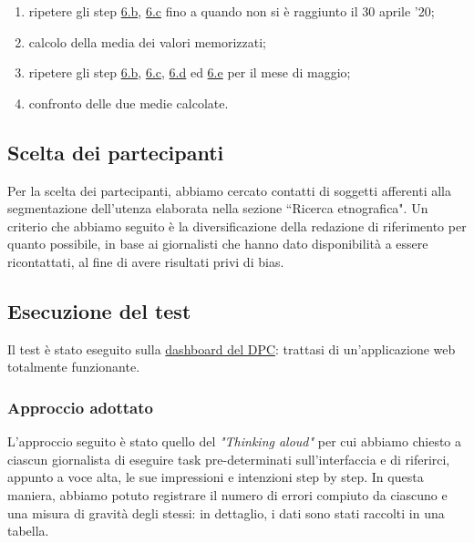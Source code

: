 \begin{enumerate}
\begin{enumerate}[label=\alph*.]
        \item ripetere gli step \hyperref[at:b]{6.b}, \hyperref[at:c]{6.c} fino a quando non si è raggiunto il 30 aprile '20; \label{at:d}
        \item calcolo della media dei valori memorizzati; \label{at:e}
        \item ripetere gli step \hyperref[at:b]{6.b}, \hyperref[at:c]{6.c}, \hyperref[at:d]{6.d} ed \hyperref[at:e]{6.e} per il mese di maggio; 
        \item confronto delle due medie calcolate.
    \end{enumerate}
\end{enumerate}

\subsection{Scelta dei partecipanti}
\label{ss:seclta-partecipanti}
Per la scelta dei partecipanti, abbiamo cercato contatti di soggetti afferenti alla segmentazione dell'utenza elaborata nella sezione ``Ricerca etnografica". Un criterio che abbiamo seguito è la diversificazione della redazione di riferimento per quanto possibile, in base ai giornalisti che hanno dato disponibilità a essere ricontattati, al fine di avere risultati privi di bias.

\subsection{Esecuzione del test}
\label{ss:vre-esecuzione-test}
Il test è stato eseguito sulla \href{https://opendatadpc.maps.arcgis.com/apps/opsdashboard/index.html#/b0c68bce2cce478eaac82fe38d4138b1}{dashboard del DPC}: trattasi di un'applicazione web totalmente funzionante.
\subsubsection{Approccio adottato}
\label{sss:approccio-adottato}
L'approccio seguito è stato quello del \textit{"Thinking aloud"} per cui abbiamo chiesto a ciascun giornalista di eseguire task pre-determinati sull'interfaccia e di riferirci, appunto a voce alta, le sue impressioni e intenzioni step by step.
\noindent
In questa maniera, abbiamo potuto registrare il numero di errori compiuto da ciascuno e una misura di gravità degli stessi: in dettaglio, i dati sono stati raccolti in una tabella.

